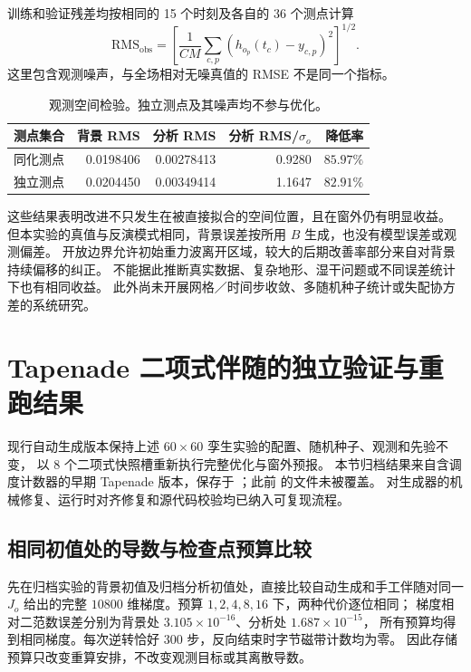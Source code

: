 \documentclass[12pt,a4paper]{article}
\begin{document}
训练和验证残差均按相同的 15 个时刻及各自的 36 个测点计算
\begin{equation}
 \mathrm{RMS}_{\mathrm{obs}}=
 \left[\frac1{CM}\sum_{c,p}(h_{o_p}(t_c)-y_{c,p})^2\right]^{1/2}.
 \label{eq:dta-observation-rms}
\end{equation}
这里包含观测噪声，与全场相对无噪真值的 RMSE 不是同一个指标。
\begin{table}[htbp]
\centering\small
\caption{观测空间检验。独立测点及其噪声均不参与优化。}
\label{tab:dta-heldout}
\begin{tabular}{lrrrr}
\toprule
测点集合 & 背景 RMS & 分析 RMS & 分析 RMS/$\sigma_o$ & 降低率\\
\midrule
同化测点 & 0.0198406 & 0.00278413 & 0.9280 & $85.97\%$\\
独立测点 & 0.0204450 & 0.00349414 & 1.1647 & $82.91\%$\\
\bottomrule
\end{tabular}
\end{table}

这些结果表明改进不只发生在被直接拟合的空间位置，且在窗外仍有明显收益。
但本实验的真值与反演模式相同，背景误差按所用 $B$ 生成，也没有模型误差或观测偏差。
开放边界允许初始重力波离开区域，较大的后期改善率部分来自对背景持续偏移的纠正。
不能据此推断真实数据、复杂地形、湿干问题或不同误差统计下也有相同收益。
此外尚未开展网格／时间步收敛、多随机种子统计或失配协方差的系统研究。

\clearpage
\section{Tapenade 二项式伴随的独立验证与重跑结果}
\label{sec:dta-tapenade-results}

现行自动生成版本保持上述 $60\times60$ 孪生实验的配置、随机种子、观测和先验不变，
以 8 个二项式快照槽重新执行完整优化与窗外预报。
本节归档结果来自含调度计数器的早期 Tapenade 版本，保存于 ；此前  的文件未被覆盖。
对生成器的机械修复、运行时对齐修复和源代码校验均已纳入可复现流程。

\subsection{相同初值处的导数与检查点预算比较}

先在归档实验的背景初值及归档分析初值处，直接比较自动生成和手工伴随对同一 $J_o$
给出的完整 $10800$ 维梯度。预算 $1,2,4,8,16$ 下，两种代价逐位相同；
梯度相对二范数误差分别为背景处 $3.105\times10^{-16}$、分析处 $1.687\times10^{-15}$，
所有预算均得到相同梯度。每次逆转恰好 300 步，反向结束时字节磁带计数均为零。
因此存储预算只改变重算安排，不改变观测目标或其离散导数。
\end{document}
